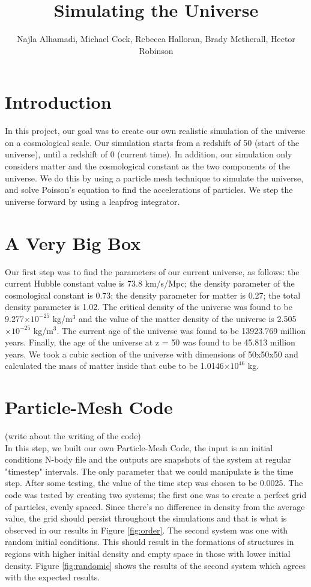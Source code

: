 \documentclass[10pt]{article}
\title{Simulating the Universe}
\author{Najla Alhamadi, Michael Cock, Rebecca Halloran, Brady Metherall, Hector Robinson}
\providecommand{\e}[1]{\ensuremath{\times 10^{#1}}}
\begin{document}
\maketitle
\section{Introduction}
	In this project, our goal was to create our own realistic simulation of the universe on a cosmological scale. Our simulation starts from a redshift of 50 (start of the universe), until a redshift of 0 (current time). In addition, our simulation only considers matter and the cosmological constant as the two components of the universe. We do this by using a particle mesh technique to simulate the universe, and solve Poisson's equation to find the accelerations of particles. We step the universe forward by using a leapfrog integrator.
\section{A Very Big Box}
	Our first step was to find the parameters of our current universe, as follows: the current Hubble constant value is 73.8 km/s/Mpc; the density parameter of the cosmological constant is 0.73; the density parameter for matter is 0.27; the total density parameter is 1.02. The critical density of the universe was found to be 9.277\e{-25} kg/m$^3$ and the value of the matter density of the universe is 2.505\e{-25} kg/m$^3$. The current age of the universe was found to be 13923.769 million years. Finally, the age of the universe at z = 50 was found to be 45.813 million years. We took a cubic section of the universe with dimensions of 50x50x50 and calculated the mass of matter inside that cube to be 1.0146\e{46} kg.  
\section{Particle-Mesh Code}
 (write about the writing of the code) \\
	In this step, we built our own Particle-Mesh Code, the input is an initial conditions N-body file and the outputs are snapshots of the system at regular "timestep" intervals. The only parameter that we could manipulate is the time step. After some testing, the value of the time step was chosen to be 0.0025. The code was tested by creating two systems; the first one was to create a perfect grid of particles, evenly spaced. Since there’s no difference in density from the average value, the grid should persist throughout the simulations and that is what is observed in our results in Figure \ref{fig:order}{}. The second system was one with random initial conditions. This should result in the formations of structures in regions with higher initial density and empty space in those with lower initial density. Figure \ref{fig:randomic}{} shows the results of the second system which agrees with the expected results.       
\end{document}
